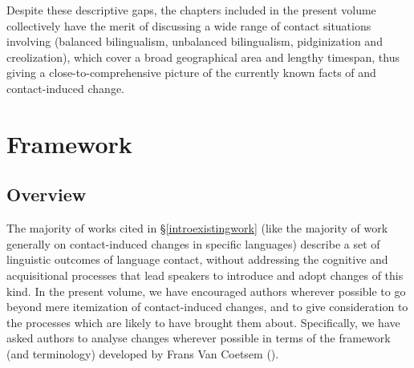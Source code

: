 \documentclass[output=paper]{langsci/langscibook}
\begin{document}
Despite these descriptive gaps, the chapters included in the present volume collectively have the merit of discussing a wide range of contact situations involving  (balanced {bilingualism}, unbalanced {bilingualism}, pidginization and creolization), which cover a broad geographical area and lengthy timespan, thus giving a close-to-comprehensive picture of the currently known facts of  and contact-induced change.

\section{Framework}\label{introvc}
\subsection{Overview}\label{introvcoverview}
The majority of works cited in §\ref{introexistingwork} (like the majority of work generally on contact-induced changes in specific languages) describe a set of linguistic outcomes of language contact, without addressing the cognitive and acquisitional processes that lead speakers to introduce and adopt changes of this kind. In the present volume, we have encouraged authors wherever possible to go beyond mere itemization of contact-induced changes, and to give consideration to the processes which are likely to have brought them about. Specifically, we have asked authors to analyse changes wherever possible in terms of the framework (and terminology) developed by Frans Van Coetsem (\citeyear{VanCoetsem1988,VanCoetsem2000}).
\end{document}
